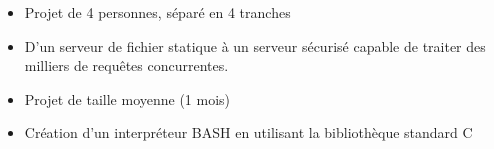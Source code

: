 \documentclass[10pt,a4paper,ragged2e]{altacv}
\begin{document}
\vspace{20px}

\begin{itemize}
    \item Projet de 4 personnes, séparé en 4 tranches
    \item D'un serveur de fichier statique à un serveur sécurisé capable de traiter des milliers de requêtes concurrentes.
\end{itemize}

\vspace{10px}


\begin{itemize}
    \item Projet de taille moyenne (1 mois)
    \item Création d'un interpréteur BASH en utilisant la bibliothèque standard C
\end{itemize}

\vspace{10px}


\clearpage
\end{document}
